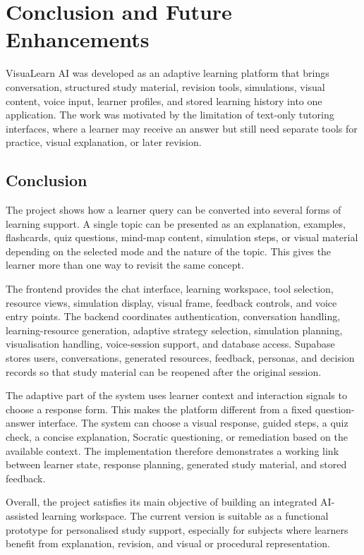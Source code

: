 \chapter{Conclusion and Future Enhancements}

VisuaLearn AI was developed as an adaptive learning platform that brings conversation, structured study material, revision tools, simulations, visual content, voice input, learner profiles, and stored learning history into one application. The work was motivated by the limitation of text-only tutoring interfaces, where a learner may receive an answer but still need separate tools for practice, visual explanation, or later revision.

\section[Conclusion]{\textbf{Conclusion}}
The project shows how a learner query can be converted into several forms of learning support. A single topic can be presented as an explanation, examples, flashcards, quiz questions, mind-map content, simulation steps, or visual material depending on the selected mode and the nature of the topic. This gives the learner more than one way to revisit the same concept.

The frontend provides the chat interface, learning workspace, tool selection, resource views, simulation display, visual frame, feedback controls, and voice entry points. The backend coordinates authentication, conversation handling, learning-resource generation, adaptive strategy selection, simulation planning, visualisation handling, voice-session support, and database access. Supabase stores users, conversations, generated resources, feedback, personas, and decision records so that study material can be reopened after the original session.

The adaptive part of the system uses learner context and interaction signals to choose a response form. This makes the platform different from a fixed question-answer interface. The system can choose a visual response, guided steps, a quiz check, a concise explanation, Socratic questioning, or remediation based on the available context. The implementation therefore demonstrates a working link between learner state, response planning, generated study material, and stored feedback.

Overall, the project satisfies its main objective of building an integrated AI-assisted learning workspace. The current version is suitable as a functional prototype for personalised study support, especially for subjects where learners benefit from explanation, revision, and visual or procedural representation.

